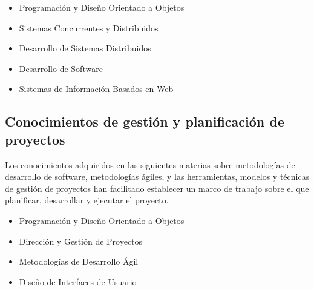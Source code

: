 \begin{itemize}
	\item Programación y Diseño Orientado a Objetos
	\item Sistemas Concurrentes y Distribuidos
	\item Desarrollo de Sistemas Distribuidos
	\item Desarrollo de Software
	\item Sistemas de Información Basados en Web
\end{itemize}


\subsection{Conocimientos de gestión y planificación de proyectos}
Los conocimientos adquiridos en las siguientes materias sobre metodologías de desarrollo de software, metodologías ágiles, y las herramientas, modelos y técnicas de gestión de proyectos han facilitado  establecer un marco de trabajo sobre el que planificar, desarrollar y ejecutar el proyecto.

\begin{itemize}
	\item Programación y Diseño Orientado a Objetos
	\item Dirección y Gestión de Proyectos
	\item Metodologías de Desarrollo Ágil
	\item Diseño de Interfaces de Usuario
\end{itemize}